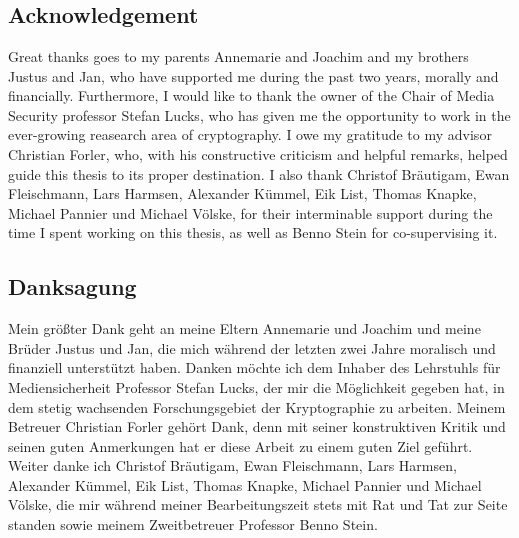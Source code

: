 
\chapter*{}
\section*{Acknowledgement}

Great thanks goes to my parents Annemarie and Joachim and my brothers Justus and Jan, who have supported me during the past two years, morally and financially.
Furthermore, I would like to thank the owner of the Chair of Media Security professor Stefan Lucks, who has given me the opportunity to work in the
ever-growing reasearch area of cryptography. I owe my gratitude to my advisor Christian Forler, who, with his constructive
criticism and helpful remarks, helped guide this thesis to its proper destination. I also thank Christof Bräutigam, Ewan Fleischmann, Lars Harmsen,
Alexander Kümmel, Eik List, Thomas Knapke, Michael Pannier und Michael Völske, for their interminable support during the time
I spent working on this thesis, as well as Benno Stein for co-supervising it.


\vfill

\section*{Danksagung}

Mein größter Dank geht an meine Eltern Annemarie und Joachim und meine Brüder Justus und Jan, die mich während der letzten zwei Jahre moralisch und finanziell unterstützt haben.
Danken möchte ich dem Inhaber des Lehrstuhls für Mediensicherheit Professor Stefan Lucks, der mir die Möglichkeit gegeben hat, in dem
stetig wachsenden Forschungsgebiet der Kryptographie zu arbeiten. Meinem Betreuer Christian Forler gehört Dank, denn mit seiner konstruktiven
Kritik und seinen guten Anmerkungen hat er diese Arbeit zu einem guten Ziel geführt.
Weiter danke ich Christof Bräutigam, Ewan Fleischmann, Lars Harmsen, Alexander Kümmel, Eik List, Thomas Knapke, Michael Pannier und Michael Völske, die mir
während meiner Bearbeitungszeit stets mit Rat und Tat zur Seite standen sowie meinem Zweitbetreuer Professor Benno Stein.

